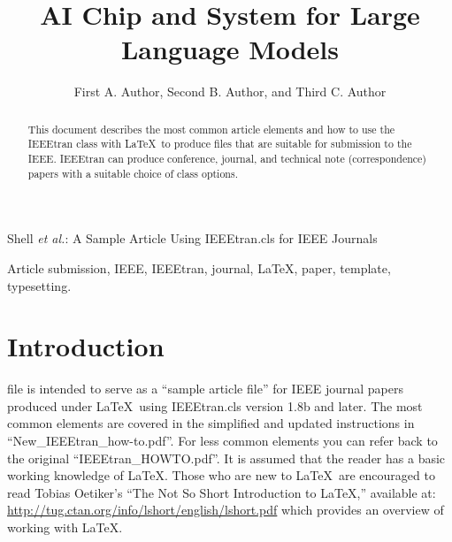 \documentclass[lettersize,journal]{IEEEtran}
\begin{document}
\title{AI Chip and System for Large Language Models}

\author{First A. Author, Second B. Author, and Third C. Author
}

%
{Shell \MakeLowercase{\textit{et al.}}: A Sample Article Using IEEEtran.cls for IEEE Journals}


\maketitle

\begin{abstract}
This document describes the most common article elements and how to use the IEEEtran class with \LaTeX \ to produce files that are suitable for submission to the IEEE.  IEEEtran can produce conference, journal, and technical note (correspondence) papers with a suitable choice of class options. 
\end{abstract}

\begin{IEEEkeywords}
Article submission, IEEE, IEEEtran, journal, \LaTeX, paper, template, typesetting.
\end{IEEEkeywords}

\section{Introduction}
 file is intended to serve as a ``sample article file''
for IEEE journal papers produced under \LaTeX\ using
IEEEtran.cls version 1.8b and later. The most common elements are covered in the simplified and updated instructions in ``New\_IEEEtran\_how-to.pdf''. For less common elements you can refer back to the original ``IEEEtran\_HOWTO.pdf''. It is assumed that the reader has a basic working knowledge of \LaTeX. Those who are new to \LaTeX \ are encouraged to read Tobias Oetiker's ``The Not So Short Introduction to \LaTeX ,'' available at: \url{http://tug.ctan.org/info/lshort/english/lshort.pdf} which provides an overview of working with \LaTeX.
\end{document}
